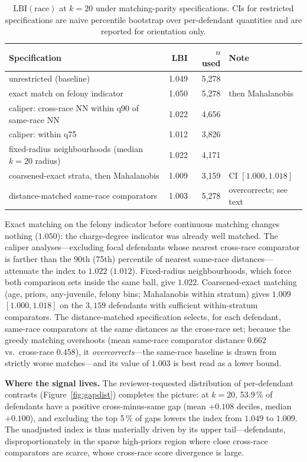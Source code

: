 \documentclass[11pt]{article}
\begin{document}
\begin{table}[h]
\centering
\caption{$\mathrm{LBI}(\text{race})$ at $k = 20$ under
matching-parity specifications. CIs for restricted specifications are
naive percentile bootstrap over per-defendant quantities and are
reported for orientation only.}
\label{tab:matchparity}
\begin{tabular}{lrrl}
\toprule
\textbf{Specification} & \textbf{LBI} & $n$ \textbf{used} & \textbf{Note} \\
\midrule
unrestricted (baseline) & 1.049 & 5{,}278 & \\
exact match on felony indicator & 1.050 & 5{,}278 & then Mahalanobis \\
caliper: cross-race NN within q90 of same-race NN & 1.022 & 4{,}656 & \\
caliper: within q75 & 1.012 & 3{,}826 & \\
fixed-radius neighbourhoods (median $k{=}20$ radius) & 1.022 & 4{,}171 & \\
coarsened-exact strata, then Mahalanobis & 1.009 & 3{,}159 & CI $[1.000, 1.018]$ \\
distance-matched same-race comparators & 1.003 & 5{,}278 & overcorrects; see text \\
\bottomrule
\end{tabular}
\end{table}

Exact matching on the felony indicator before continuous matching
changes nothing ($1.050$): the charge-degree indicator was already
well matched. The caliper analyses---excluding focal defendants whose
nearest cross-race comparator is farther than the 90th (75th)
percentile of nearest same-race distances---attenuate the index to
$1.022$ ($1.012$). Fixed-radius neighbourhoods, which force both
comparison sets inside the same ball, give $1.022$. Coarsened-exact
matching (age, priors, any-juvenile, felony bins; Mahalanobis within
stratum) gives $1.009$ $[1.000, 1.018]$ on the $3{,}159$ defendants
with sufficient within-stratum comparators. The distance-matched
specification selects, for each defendant, same-race comparators at
the same distances as the cross-race set; because the greedy matching
overshoots (mean same-race comparator distance $0.662$ vs.\
cross-race $0.458$), it \emph{overcorrects}---the same-race baseline
is drawn from strictly worse matches---and its value of $1.003$ is
best read as a lower bound.

\textbf{Where the signal lives.} The reviewer-requested distribution
of per-defendant contrasts (Figure~\ref{fig:gapdist}) completes the
picture: at $k = 20$, 53.9\,\% of defendants have a positive
cross-minus-same gap (mean $+0.108$ deciles, median $+0.100$), and
excluding the top 5\,\% of gaps lowers the index from $1.049$ to
$1.009$. The unadjusted index is thus materially driven by its upper
tail---defendants, disproportionately in the sparse high-priors
region where close cross-race comparators are scarce, whose
cross-race score divergence is large.
\end{document}
